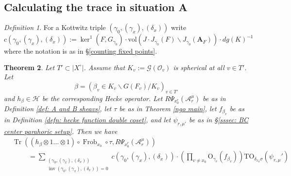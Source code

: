 \documentclass[reqno]{amsart}
\numberwithin{equation}{section}
\newcommand{\Cal}[1]{\mathcal{#1}}
\newcommand{\A}{\mathbf{A}}
\newcommand{\mrm}[1]{\mathrm{#1}}
\newcommand{\cX}{X^{\circ}}
\DeclareMathOperator{\Frob}{Frob}
\DeclareMathOperator{\Tr}{Tr}
\DeclareMathOperator{\inv}{inv}
\newtheorem{thm}{Theorem}[section]
\theoremstyle{remark}
\newtheorem{defn}[thm]{Definition}
\numberwithin{equation}{section}
\begin{document}
\subsection{Calculating the trace in situation A}\label{trace A section}

\begin{defn}For a Kottwitz triple $(\gamma_0, (\gamma_x), (\delta_x))$ write 
\[
c(\gamma_0, (\gamma_x), (\delta_x)) := 
\ker^1(F, G_{\gamma_0}) \cdot \mrm{vol}(J \cdot J_{\gamma_0}(F)  \backslash J_{\gamma_0} (\A_F)) \cdot dg(K)^{-1}  
\]
where the notation is as in \S \ref{counting fixed points}.
\end{defn}

\begin{thm}\label{trace situation A}
Let $T' \subset |\cX|$. Assume that $K_v := \Cal{G}(\Cal{O}_v)$ is spherical at all $v \in T'$. Let
\[
\beta = (\beta_v  \in K_v \backslash G(F_v) /  K_v)_{v \in T'}
\]
and $h_{\beta}  \in \Cal{H}$ be the corresponding Hecke operator. Let $R\Psi_{x_0^r}(\Cal{A}_r^{\mu})$ be as in Definition \ref{def: A and B sheavs}, let $\tau$ be as in Theorem \ref{ngo main}, let $f_{\beta_v}$ be as in Definition \ref{defn: hecke function double coset}, and let $\psi_{r,\mu'}$ be as in \S \ref{sssec: BC center parahoric setup}. Then we have 
\begin{align*}
&\Tr(( h_{\beta} \otimes 1 \ldots \otimes 1 ) \circ \Frob_{x_0} \circ  \tau ,  R\Psi_{x_0^r}(\Cal{A}_r^{\mu}))  \\
& \hspace{1cm} =   \sum_{\substack{ (\gamma_0, (\gamma_x),(\delta_x)) \\ \inv(\gamma_0, (\gamma_x),(\delta_x) ) = 0  }} 
c(\gamma_0, (\gamma_x), (\delta_x))   \cdot  \left(\prod_{v \neq x_0}\mrm{O}_{\gamma_v}(f_{\beta_v})  \right) \mrm{TO}_{\delta_{x_0} \sigma}(\psi_{r,\mu}')
\end{align*}
\end{thm}
\end{document}
